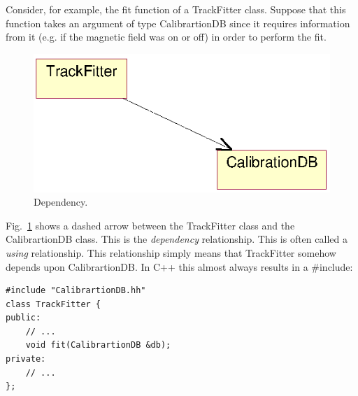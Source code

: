 \documentclass[twoside]{article}
\begin{document}
Consider, for example, the fit function of a TrackFitter class.
Suppose that this function takes an argument of type CalibrartionDB
since it requires information from it (e.g. if the magnetic field was
on or off) in order to perform the fit.
\begin{figure}[htb]
    \begin{center}
        \includegraphics{umlDependency.eps}
        \caption{Dependency.}
        \label{fig:umlDependency}
    \end{center}
\end{figure}
Fig.~\ref{fig:umlDependency} shows a dashed arrow between the
TrackFitter class and the CalibrartionDB class. This is the
\emph{dependency} relationship. This is often called a \emph{using}
relationship.  This relationship simply means that TrackFitter somehow
depends upon CalibrartionDB. In C++ this almost always results in a
\#include:

{\footnotesize
\begin{verbatim}
#include "CalibrartionDB.hh"
class TrackFitter {
public:
    // ...
    void fit(CalibrartionDB &db);
private:
    // ...
};
\end{verbatim}
}%

%
%

\printindex
\end{document}
